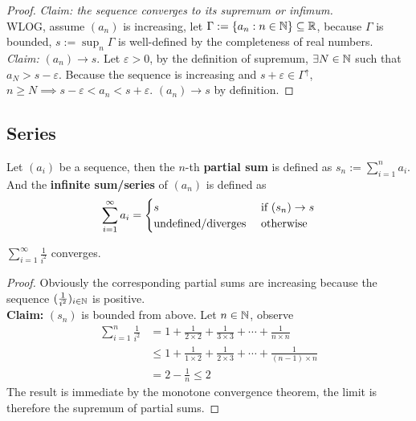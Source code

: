 \documentclass[11pt]{article}
\begin{document}
	\begin{proof}
		\emph{Claim: the sequence converges to its supremum or infimum.} \\
		WLOG, assume $(a_n)$ is increasing, let $\Gamma := \{a_n: n \in \mathbb{N}\} \subseteq \mathbb{R}$, because $\Gamma$ is bounded, $s := \sup_n \Gamma$ is well-defined by the completeness of real numbers.\\
		\emph{Claim:} $(a_n) \to s$. Let $\varepsilon > 0$, by the definition of supremum, $\exists N \in \mathbb{N}$ such that $a_N > s - \varepsilon$. Because the sequence is increasing and $s + \varepsilon \in \Gamma^\uparrow$, $n \geq N \implies s - \varepsilon < a_n  < s + \varepsilon$. $(a_n) \to s$ by definition.
	\end{proof}
	
	\subsection{Series}
	\begin{definition}
		Let $(a_i)$ be a sequence, then the $n$-th \textbf{partial sum} is defined as $s_n := \sum_{i=1}^n a_i$. And the \textbf{infinite sum/series} of $(a_n)$ is defined as 
		\begin{align}
			\sum_{i=1}^\infty a_i
			= \begin{cases}
				s &\text{{ if }} (s_n) \to s \\
				\text{{undefined/diverges}} &\text{{ otherwise}}
			\end{cases}
		\end{align}
	\end{definition}
	
	\begin{example}
		$\sum_{i=1}^\infty \frac{1}{i^2}$ converges.
	\end{example}
	
	\begin{proof}
		Obviously the corresponding partial sums are increasing because the sequence $(\frac{1}{i^2})_{i \in \mathbb{N}}$ is positive. \\
		\textbf{Claim:} $(s_n)$ is bounded from above. Let $n \in \mathbb{N}$, observe
		\begin{align}
			\sum_{i=1}^n \frac{1}{i^2} &= 1 + \frac{1}{2 \times 2} + \frac{1}{3 \times 3} + \cdots + \frac{1}{n \times n} \\
			&\leq 1 + \frac{1}{1 \times 2} + \frac{1}{2 \times 3} + \cdots + \frac{1}{(n-1) \times n} \\
			&= 2 - \frac{1}{n} \leq 2
		\end{align}
		The result is immediate by the monotone convergence theorem, the limit is therefore the supremum of partial sums.
	\end{proof}
	
\end{document}
